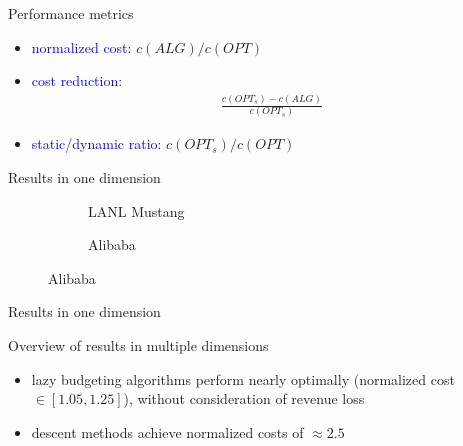 \documentclass{beamer}
\def\b{\textcolor{blue}}
\begin{document}
\begin{frame}{Performance metrics}
\begin{itemize}
    \item \b{normalized cost}: $c(ALG) / c(OPT)$\pause
    \item \b{cost reduction}: \begin{align*}
        \frac{c(OPT_s) - c(ALG)}{c(OPT_s)}
    \end{align*}\pause
    \item \b{static/dynamic ratio}: $c(OPT_s) / c(OPT)$
\end{itemize}
\end{frame}

\begin{frame}{Results in one dimension}
\begin{figure}
    \begin{subfigure}[b]{.50\linewidth}
    \resizebox{\textwidth}{!}{}
    \caption{LANL Mustang}
    \end{subfigure}
    \begin{subfigure}[b]{.48\linewidth}
    \resizebox{\textwidth}{!}{}
    \caption{Alibaba}
    \end{subfigure}
\end{figure}
\end{frame}

\begin{frame}{Results in one dimension}
\begin{figure}
    \begin{subfigure}[b]{.38\linewidth}
    \resizebox{\textwidth}{!}{}
    \end{subfigure}\pause
    \begin{subfigure}[b]{.38\linewidth}
    \resizebox{\textwidth}{!}{}
    \end{subfigure}\pause
    \par\bigskip
    \begin{subfigure}[b]{.38\linewidth}
    \resizebox{\textwidth}{!}{}
    \end{subfigure}
\end{figure}
\end{frame}

\begin{frame}{Overview of results in multiple dimensions}
\begin{itemize}
    \item lazy budgeting algorithms perform nearly optimally (normalized cost $\in [1.05, 1.25]$), without consideration of revenue loss\pause
    \item descent methods achieve normalized costs of $\approx 2.5$
\end{itemize}
\end{frame}
\end{document}
